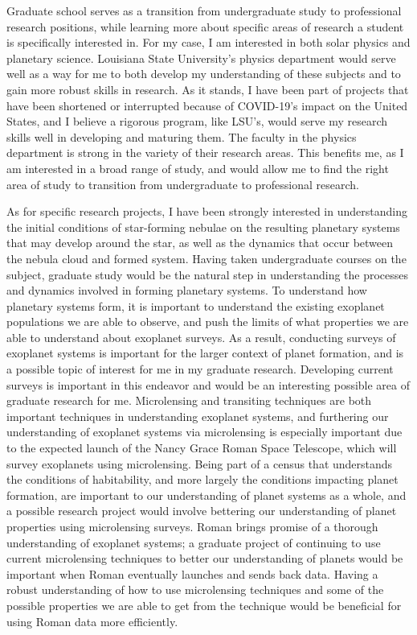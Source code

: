 \documentclass[12pt,letterpaper]{article}
\begin{document}
Graduate school serves as a transition from undergraduate study to professional research positions, while learning more about specific areas of research a student is specifically interested in. For my case, I am interested in both solar physics and planetary science. Louisiana State University's physics department would serve well as a way for me to both develop my understanding of these subjects and to gain more robust skills in research. As it stands, I have been part of projects that have been shortened or interrupted because of COVID-19's impact on the United States, and I believe a rigorous program, like LSU's, would serve my research skills well in developing and maturing them. The faculty in the physics department is strong in the variety of their research areas. This benefits me, as I am interested in a broad range of study, and would allow me to find the right area of study to transition from undergraduate to professional research. 

As for specific research projects, I have been strongly interested in understanding the initial conditions of star-forming nebulae on the resulting planetary systems that may develop around the star, as well as the dynamics that occur between the nebula cloud and formed system. Having taken undergraduate courses on the subject, graduate study would be the natural step in understanding the processes and dynamics involved in forming planetary systems. To understand how planetary systems form, it is important to understand the existing exoplanet populations we are able to observe, and push the limits of what properties we are able to understand about exoplanet surveys. As a result, conducting surveys of exoplanet systems is important for the larger context of planet formation, and is a possible topic of interest for me in my graduate research. Developing current surveys is important in this endeavor and would be an interesting possible area of graduate research for me. Microlensing and transiting techniques are both important techniques in understanding exoplanet systems, and furthering our understanding of exoplanet systems via microlensing is especially important due to the expected launch of the Nancy Grace Roman Space Telescope, which will survey exoplanets using microlensing. Being part of a census that understands the conditions of habitability, and more largely the conditions impacting planet formation, are important to our understanding of planet systems as a whole, and a possible research project would involve bettering our understanding of planet properties using microlensing surveys. Roman brings promise of a thorough understanding of exoplanet systems; a graduate project of continuing to use current microlensing techniques to better our understanding of planets would be important when Roman eventually launches and sends back data. Having a robust understanding of how to use microlensing techniques and some of the possible properties we are able to get from the technique would be beneficial for using Roman data more efficiently.
\end{document}
